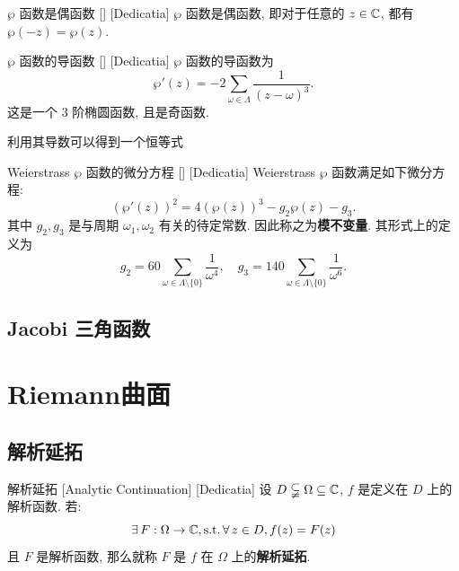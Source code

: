         \begin{ppt}
            {\(\wp\) 函数是偶函数}
            []
            [Dedicatia]
            \(\wp\) 函数是偶函数, 即对于任意的 \(z\in\operatorname{\mathbb{C}}\), 都有
            \(\wp(-z)=\wp(z).\)
        \end{ppt}

        \begin{ppt}
            {\(\wp\) 函数的导函数}
            []
            [Dedicatia]
            \(\wp\) 函数的导函数为
            \[\wp'(z)=-2\sum_{\omega\in\Lambda}\frac{1}{(z-\omega)^3}.\]
            这是一个 3 阶椭圆函数, 且是奇函数.
        \end{ppt}

        利用其导数可以得到一个恒等式

        \begin{ppt}
            {Weierstrass \(\wp\) 函数的微分方程}
            []
            [Dedicatia]
            Weierstrass \(\wp\) 函数满足如下微分方程:
            \[(\wp'(z))^2=4(\wp(z))^3-g_2\wp(z)-g_3.\]
            其中 \(g_2,g_3\) 是与周期 \(\omega_1,\omega_2\) 有关的待定常数. 因此称之为\textbf{模不变量}. 其形式上的定义为
            \[g_2=60\sum_{\omega\in\Lambda\setminus\{0\}}\frac{1}{\omega^4},\quad g_3=140\sum_{\omega\in\Lambda\setminus\{0\}}\frac{1}{\omega^6}.\]
        \end{ppt}

    \subsection{Jacobi 三角函数}

\section{Riemann曲面}

    \subsection{解析延拓}

        \begin{dfn}
            {解析延拓}
            [Analytic Continuation]
            [Dedicatia]
            设 \(D\subsetneqq\Omega\subseteq\operatorname{\mathbb{C}}\), \(f\) 是定义在 \(D\) 上的解析函数. 若:
            \[\exists\,F:\Omega\to\operatorname{\mathbb{C}}, \operatorname{\text{s.t.}} \forall\,z\in D,f(z)=F(z)\]
            且 \(F\) 是解析函数, 那么就称 \(F\) 是 \(f\) 在 \(\Omega\) 上的\textbf{解析延拓}.
        \end{dfn}

